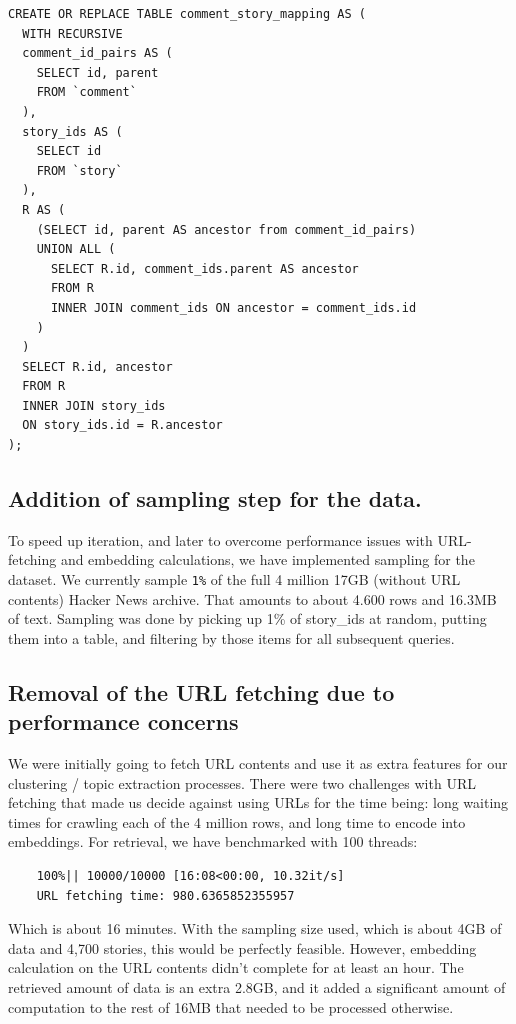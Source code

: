 \documentclass[nonacm,sigconf]{acmart}
\begin{document}
\begin{verbatim}
CREATE OR REPLACE TABLE comment_story_mapping AS (
  WITH RECURSIVE
  comment_id_pairs AS (
    SELECT id, parent
    FROM `comment`
  ),
  story_ids AS (
    SELECT id
    FROM `story`
  ),
  R AS (
    (SELECT id, parent AS ancestor from comment_id_pairs)
    UNION ALL (
      SELECT R.id, comment_ids.parent AS ancestor
      FROM R
      INNER JOIN comment_ids ON ancestor = comment_ids.id
    )
  )
  SELECT R.id, ancestor
  FROM R
  INNER JOIN story_ids
  ON story_ids.id = R.ancestor
);
\end{verbatim}

\subsection{Addition of sampling step for the data.}

To speed up iteration, and later to overcome performance issues with URL-fetching and embedding calculations, we have implemented sampling for the dataset. We currently sample \texttt{1\%} of the full 4 million 17GB (without URL contents) Hacker News archive. That amounts to about 4.600 rows and 16.3MB of text. Sampling was done by picking up 1\% of story\_ids at random, putting them into a table, and filtering by those items for all subsequent queries. 

\subsection{Removal of the URL fetching due to performance concerns}

We were initially going to fetch URL contents and use it as extra features for our clustering / topic extraction processes. There were two challenges with URL fetching that made us decide against using URLs for the time being: long waiting times for crawling each of the 4 million rows, and long time to encode into embeddings. For retrieval, we have benchmarked with 100 threads: 

\begin{verbatim}
    100%|| 10000/10000 [16:08<00:00, 10.32it/s]
    URL fetching time: 980.6365852355957
\end{verbatim}

Which is about 16 minutes.  With the sampling size used, which is about 4GB of data and 4,700 stories, this would be perfectly feasible. However, embedding calculation on the URL contents didn't complete for at least an hour. The retrieved amount of data is an extra 2.8GB, and it added a significant amount of computation to the rest of 16MB that needed to be processed otherwise.
\end{document}
